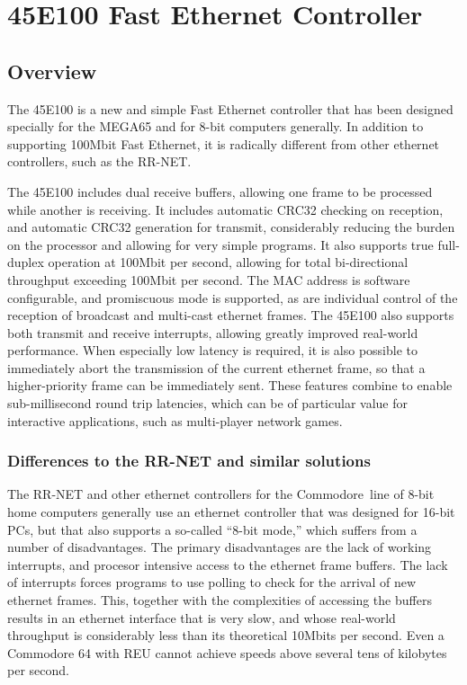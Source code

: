 \chapter{45E100 Fast Ethernet Controller}

\section{Overview}

The 45E100 is a new and simple Fast Ethernet controller that has been
designed specially for the MEGA65 and for 8-bit computers generally.
In addition to supporting 100Mbit Fast Ethernet, it is radically
different from other ethernet controllers, such as the RR-NET.

The 45E100 includes dual receive buffers, allowing one frame to be
processed while another is receiving.  It includes automatic CRC32
checking on reception, and automatic CRC32 generation for transmit, considerably
reducing the burden on the processor and allowing for very simple programs.  It also supports true
full-duplex operation at 100Mbit per second, allowing for total bi-directional
throughput exceeding 100Mbit per second.  The MAC address is software
configurable, and promiscuous mode is supported, as are individual control
of the reception of broadcast and multi-cast ethernet frames.  The 45E100 also
supports both transmit and receive interrupts, allowing greatly improved
real-world performance. When especially low latency is required, it is also possible
to immediately abort the transmission of the current ethernet frame, so that a
higher-priority frame can be immediately sent.
These features combine to enable sub-millisecond round trip latencies,
which can be of particular value for interactive applications, such as multi-player network
games.

\subsection{Differences to the RR-NET and similar solutions}

The RR-NET and other ethernet controllers for the Commodore\texttrademark \ line
of 8-bit home computers generally use an ethernet controller that was
designed for 16-bit PCs, but that also supports a so-called ``8-bit mode,''
which suffers from a number of disadvantages. The primary disadvantages
are the lack of working interrupts, and procesor intensive access to
the ethernet frame buffers.  The lack of interrupts forces programs to
use polling to check for the arrival of new ethernet frames.  This,
together with the complexities of accessing the buffers results in an
ethernet interface that is very slow, and whose real-world throughput
is considerably less than its theoretical 10Mbits per second.  Even
a Commodore 64 with REU cannot achieve speeds above several tens of
kilobytes per second.

